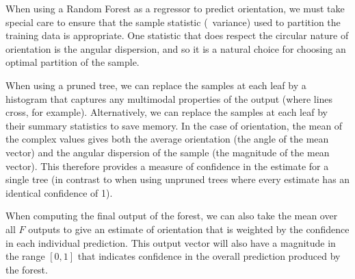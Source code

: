 When using a Random Forest as a regressor to predict orientation, we must take special care to ensure that the sample statistic (\eg~variance) used to partition the training data is appropriate. One statistic that does respect the circular nature of orientation is the angular dispersion, and so it is a natural choice for choosing an optimal partition of the sample.

When using a pruned tree, we can replace the samples at each leaf by a histogram that captures  any multimodal properties of the output (where lines cross, for example). Alternatively, we can replace the samples at each leaf by their summary statistics to save memory. In the case of orientation, the mean of the complex values gives both the average orientation (the angle of the mean vector) and the angular dispersion of the sample (the magnitude of the mean vector). This therefore provides a measure of confidence in the estimate for a single tree (in contrast to when using unpruned trees where every estimate has an identical confidence of 1).

When computing the final output of the forest, we can also take the mean over all $F$ outputs to give an estimate of orientation that is weighted by the confidence in each individual prediction. This output vector will also have a magnitude in the range $[0,1]$ that indicates confidence in the overall prediction produced by the forest.
